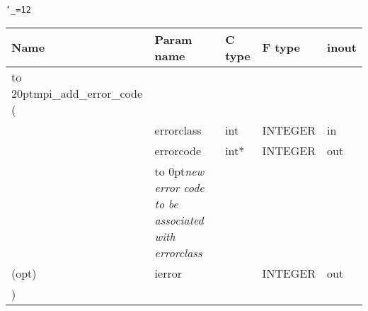 \begingroup\tt\catcode`\_=12
\begin{tabular}{lllll}
\toprule
\textrm{Name}&\textrm{Param name}&\textrm{C type}&\textrm{F type}&\textrm{inout}\\
\midrule
\hbox to 20pt{mpi_add_error_code (\hss} \\
&errorclass&int&INTEGER&in\\
&errorcode&int*&INTEGER&out\\ [-3pt]
&\hbox to 0pt{\footnotesize\sl new error code to be associated with errorclass\hss}\\
(opt)&ierror&&INTEGER&out\\
)\\
\bottomrule
\end{tabular}
\endgroup

